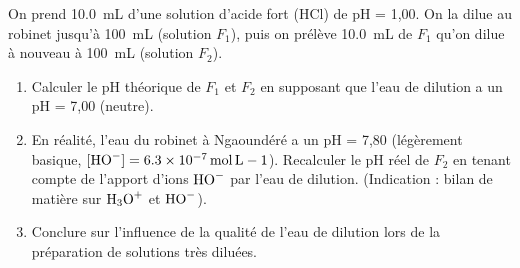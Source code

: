 \documentclass[11pt]{article}
\begin{document}
\begin{exercice}
On prend \SI{10,0}{mL} d'une solution d'acide fort (HCl) de pH = 1,00. On la dilue au robinet jusqu'à \SI{100}{mL} (solution $F_1$), puis on prélève \SI{10,0}{mL} de $F_1$ qu'on dilue à nouveau à \SI{100}{mL} (solution $F_2$).
\begin{enumerate}
    \item Calculer le pH théorique de $F_1$ et $F_2$ en supposant que l'eau de dilution a un pH = 7,00 (neutre).
    \item En réalité, l'eau du robinet à Ngaoundéré a un pH = 7,80 (légèrement basique, $[\ce{HO-}] = \SI{6,3e-7}{mol.L-1}$). Recalculer le pH réel de $F_2$ en tenant compte de l'apport d'ions $\ce{HO-}$ par l'eau de dilution. (Indication : bilan de matière sur $\ce{H3O+}$ et $\ce{HO-}$).
    \item Conclure sur l'influence de la qualité de l'eau de dilution lors de la préparation de solutions très diluées.
\end{enumerate}
\end{exercice}
\end{document}
